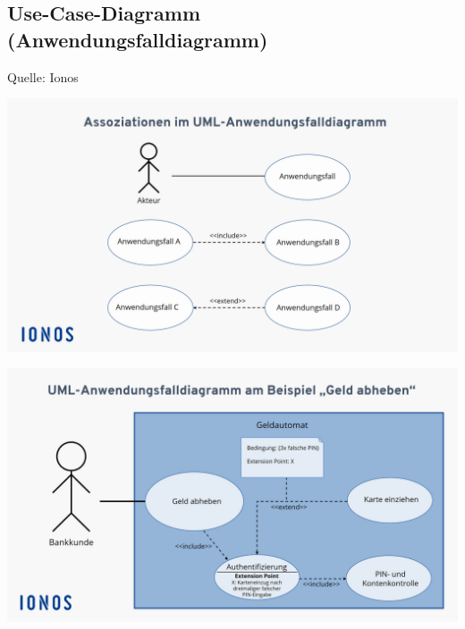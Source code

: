 
\subsection{Use-Case-Diagramm (Anwendungsfalldiagramm)}
\label{sec:UseCaseDiagramm}

Quelle: Ionos \cite{IonosUseCase}

\begin{center}
	\includegraphics[scale=.25]{Bilder/UseCaseDiagram.png}
	
	\includegraphics[scale=.25]{Bilder/UseCaseDiagramBeispiel.png}
\end{center}

